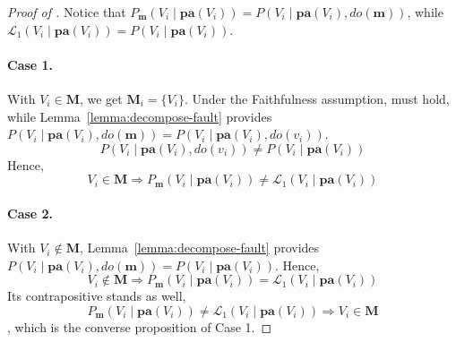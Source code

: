 \begin{proof}[Proof of ]
	Notice that $P_{\mathbf{m}}(V_{i} \mid \mathbf{pa}(V_{i})) = P(V_{i} \mid \mathbf{pa}(V_{i}), do(\mathbf{m}))$, while $\mathcal{L}_{1}(V_{i} \mid \mathbf{pa}(V_{i})) = P(V_{i} \mid \mathbf{pa}(V_{i}))$.

    \paragraph{Case 1.}
    With $V_{i} \in \mathbf{M}$, we get $\mathbf{M}_{i} = \{V_{i}\}$.
	Under the Faithfulness assumption,  must hold, while Lemma~\ref{lemma:decompose-fault} provides $P(V_{i} \mid \mathbf{pa}(V_{i}), do(\mathbf{m})) = P(V_{i} \mid \mathbf{pa}(V_{i}), do(v_{i}))$.
	\begin{equation}\label{eqn:faithfulness-conditional}
		P(V_{i} \mid \mathbf{pa}(V_{i}), do(v_{i})) \neq P(V_{i} \mid \mathbf{pa}(V_{i}))
	\end{equation}
	Hence, $$V_{i} \in \mathbf{M} \Rightarrow P_{\mathbf{m}}(V_{i} \mid \mathbf{pa}(V_{i})) \neq \mathcal{L}_{1}(V_{i} \mid \mathbf{pa}(V_{i}))$$
	
	\paragraph{Case 2.}
	With $V_{i} \notin \mathbf{M}$, Lemma~\ref{lemma:decompose-fault} provides $P(V_{i} \mid \mathbf{pa}(V_{i}), do(\mathbf{m})) = P(V_{i} \mid \mathbf{pa}(V_{i}))$.
	Hence, $$V_{i} \notin \mathbf{M} \Rightarrow P_{\mathbf{m}}(V_{i} \mid \mathbf{pa}(V_{i})) = \mathcal{L}_{1}(V_{i} \mid \mathbf{pa}(V_{i}))$$
	Its contrapositive stands as well, $$P_{\mathbf{m}}(V_{i} \mid \mathbf{pa}(V_{i})) \neq \mathcal{L}_{1}(V_{i} \mid \mathbf{pa}(V_{i})) \Rightarrow V_{i} \in \mathbf{M}$$, which is the converse proposition of Case 1.



\end{proof}
